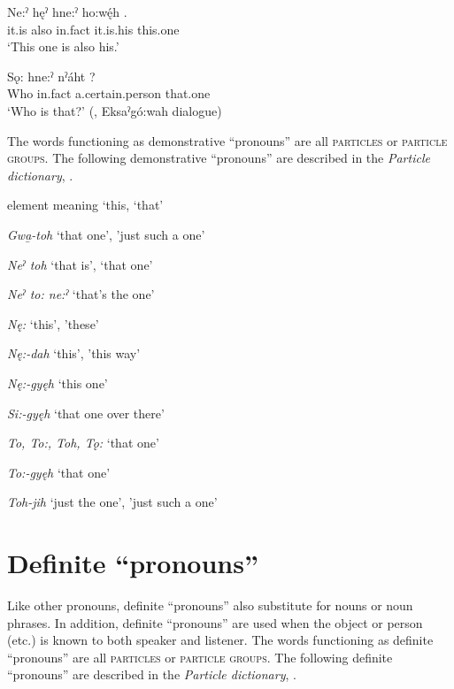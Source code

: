 \ea\label{ex:demp} 
 \gll Ne:ˀ hęˀ hne:ˀ ho:wę́h . \\
it.is also in.fact it.is.his this.one\\
\glt ‘This one is also his.’
\z

\ea\label{ex:demp2} 
 \gll Sǫ: hne:ˀ nˀáht ? \\
Who in.fact a.certain.person that.one\\
\glt ‘Who is that?’ (\cite[88]{mithun_watewayestanih_1984}, Eksaˀgó:wah dialogue) 
\z



The words functioning as demonstrative “pronouns” are all \textsc{particles} or \textsc{particle groups}. The following demonstrative “pronouns” are described in the \textit{Particle dictionary}, . 

\begin{CayugaRelated}
    
\item{}  element meaning ‘this, ‘that’\\
\item{} \textit{Gwa̱-toh} ‘that one’, 'just such a one’\\
\item{} \textit{Neˀ toh} ‘that is’, ‘that one’\\
\item{} \textit{Neˀ to: ne:ˀ} ‘that’s the one’\\
\item{} \textit{Nę:} ‘this’, 'these’\\
\item{} \textit{Nę:-dah} ‘this’, 'this way’\\
\item{} \textit{Nę:-gyęh} ‘this one’\\
\item{} \textit{Si:-gyęh} ‘that one over there’\\
\item{} \textit{To, To:, Toh, Tǫ:} ‘that one’\\
\item{} \textit{To:-gyęh} ‘that one’\\
\item{} \textit{Toh-jih} ‘just the one’, 'just such a one’\\
\end{CayugaRelated}


\section{Definite “pronouns”} \label{ch:’Definite pronouns’}
Like other pronouns, definite “pronouns” also substitute for nouns or noun phrases. In addition, definite “pronouns” are used when the object or person (etc.) is known to both speaker and listener. The words functioning as definite “pronouns” are all \textsc{particles} or \textsc{particle groups}. The following definite “pronouns” are described in the \textit{Particle dictionary}, . 

